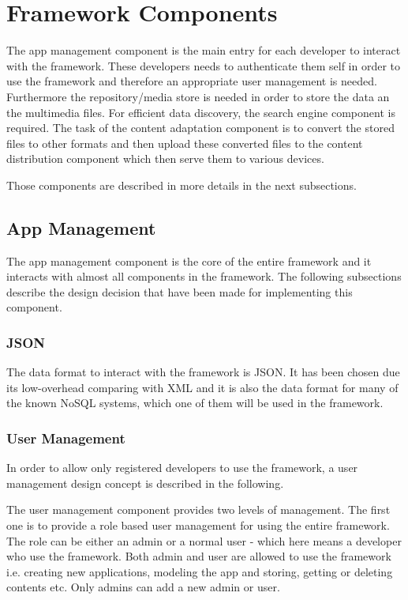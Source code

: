 \section{Framework Components\label{sec:des_com}}
The app management component is the main entry for each developer to interact with the framework. These developers needs to authenticate them self in order to use the framework and therefore an appropriate user management is needed. Furthermore the repository/media store is needed in order to store the data an the multimedia files. For efficient data discovery, the search engine component  is required. The task of the content adaptation component is to convert the stored files to other formats and then upload these converted files to the content distribution component which then serve them to various devices.

Those components are described in more details in the next subsections.
 
\subsection{App Management\label{sec:des_app_man}}

The app management component is the core of the entire framework and it interacts with almost all components in the framework. The following subsections describe the design decision that have been made for implementing this component.

\subsubsection{JSON}
The data format to interact with the framework is \ac{JSON}. It has been chosen due its low-overhead comparing with XML and it is also the data format for many of the known \ac{NoSQL} systems, which one of them will be used in the framework.
 
\subsubsection{User Management \label{sec:des_user_man}}
In order to allow only registered developers to use the framework, a user management design concept is described in the following.

The user management component provides two levels of management. The first one is to provide a role based user management for using the entire framework. The role can be either an admin or a normal user - which here means a developer who use the framework. Both admin and user are allowed to use the framework i.e. creating new applications, modeling the app and storing, getting or deleting contents etc. Only admins can add a new admin or user.

